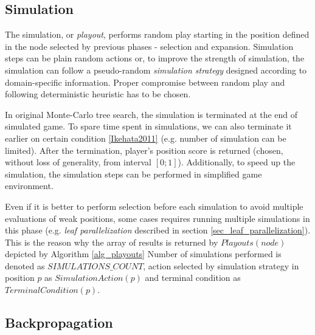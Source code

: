 \subsection{Simulation}
\label{sec_simulation}

\begin{algorithm}
\DontPrintSemicolon
\caption{$Playouts(node)$
\label{alg_playouts}}
\end{algorithm}

The simulation, or \emph{playout}, performs random play starting in the position defined in the
node selected by previous phases - selection and expansion. Simulation steps can be plain
random actions or, to improve the strength of
simulation, the simulation can follow a pseudo-random \emph{simulation strategy} designed according to
domain-specific information. Proper compromise between random play and following deterministic
heuristic has to be chosen.

In original Monte-Carlo tree search, the simulation is terminated at the end of simulated game.
To spare time spent in simulations, we can also terminate it earlier on certain condition
\ref{Ikehata2011} (e.g. number of simulation can be limited). After the termination, player's
position score is returned (chosen, without loss of generality, from interval $[0;1]$).
Additionally, to speed up the simulation, the simulation steps can be performed in
simplified game environment.

Even if it is better to perform selection before each simulation to avoid multiple 
evaluations of weak positions, some cases requires running multiple simulations in this phase
(e.g. \emph{leaf parallelization} described in section \ref{sec_leaf_parallelization}). This is
the reason why the array of results is returned by $Playouts(node)$ depicted by Algorithm
\ref{alg_playouts} Number of simulations performed is denoted as $SIMULATIONS\_COUNT$, action
selected by simulation strategy in position $p$ as $SimulationAction(p)$ and terminal condition
as $TerminalCondition(p)$.


\subsection{Backpropagation}

